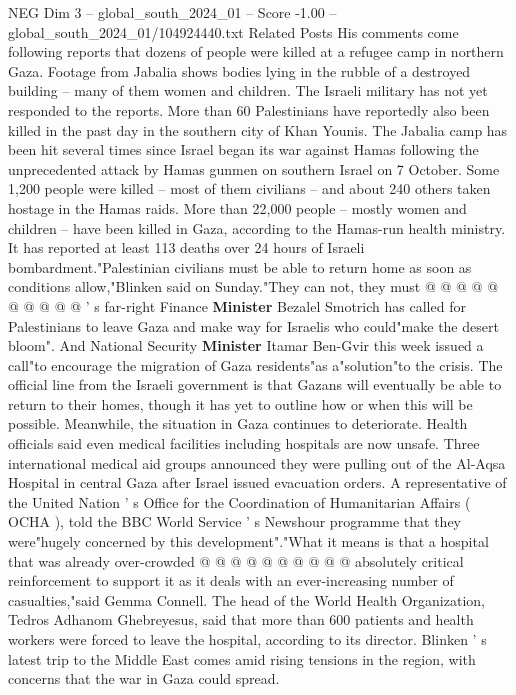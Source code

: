 \begin{textsample}{NEG Dim 3 – global\_south\_2024\_01 – Score -1.00 – global\_south\_2024\_01/104924440.txt}  \label{ex:f3_neg_078}
Related Posts His comments come following reports that dozens of people were killed at a refugee camp in northern Gaza.
Footage from Jabalia shows bodies lying in the rubble of a destroyed building -- many of them women and children.
The Israeli military has not yet responded to the reports.
More than 60 Palestinians have reportedly also been killed in the past day in the southern city of Khan Younis.
The Jabalia camp has been hit several times since Israel began its war against Hamas following the unprecedented attack by Hamas gunmen on southern Israel on 7 October.
Some 1,200 people were killed -- most of them civilians -- and about 240 others taken hostage in the Hamas raids.
More than 22,000 people -- mostly women and children -- have been killed in Gaza, according to the Hamas-run health ministry.
It has reported at least 113 deaths over 24 hours of Israeli bombardment."Palestinian civilians must be able to return home as soon as conditions allow,"Blinken said on Sunday."They can not, they must @ @ @ @ @ @ @ @ @ @ ' s far-right Finance \textbf{Minister} Bezalel Smotrich has called for Palestinians to leave Gaza and make way for Israelis who could"make the desert bloom".
And National Security \textbf{Minister} Itamar Ben-Gvir this week issued a call"to encourage the migration of Gaza residents"as a"solution"to the crisis.
The official line from the Israeli government is that Gazans will eventually be able to return to their homes, though it has yet to outline how or when this will be possible.
Meanwhile, the situation in Gaza continues to deteriorate.
Health officials said even medical facilities including hospitals are now unsafe.
Three international medical aid groups announced they were pulling out of the Al-Aqsa Hospital in central Gaza after Israel issued evacuation orders.
A representative of the United Nation ' s Office for the Coordination of Humanitarian Affairs ( OCHA ), told the BBC World Service ' s Newshour programme that they were"hugely concerned by this development"."What it means is that a hospital that was already over-crowded @ @ @ @ @ @ @ @ @ @ absolutely critical reinforcement to support it as it deals with an ever-increasing number of casualties,"said Gemma Connell.
The head of the World Health Organization, Tedros Adhanom Ghebreyesus, said that more than 600 patients and health workers were forced to leave the hospital, according to its director.
Blinken ' s latest trip to the Middle East comes amid rising tensions in the region, with concerns that the war in Gaza could spread.

\end{textsample}
